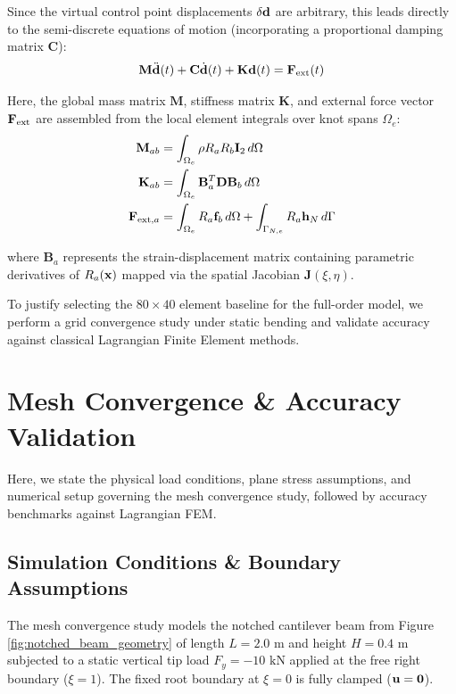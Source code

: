 Since the virtual control point displacements $\delta \mathbf{d}$ are arbitrary, this leads directly to the semi-discrete equations of motion (incorporating a proportional damping matrix $\mathbf{C}$):
\begin{equation}
    \mathbf{M}\ddot{\mathbf{d}}(t) + \mathbf{C}\dot{\mathbf{d}}(t) + \mathbf{K}\mathbf{d}(t) = \mathbf{F}_{\text{ext}}(t)
\end{equation}

Here, the global mass matrix $\mathbf{M}$, stiffness matrix $\mathbf{K}$, and external force vector $\mathbf{F}_{\text{ext}}$ are assembled from the local element integrals over knot spans $\Omega_e$:
\begin{align}
    \mathbf{M}_{ab}   & = \int_{\Omega_e} \rho R_a R_b \mathbf{I}_2 \, d\Omega                                      \\
    \mathbf{K}_{ab}   & = \int_{\Omega_e} \mathbf{B}_a^T \mathbf{D} \mathbf{B}_b \, d\Omega                         \\
    \mathbf{F}_{\text{ext}, a} & = \int_{\Omega_e} R_a \mathbf{f}_b \, d\Omega + \int_{\Gamma_{N,e}} R_a \mathbf{h}_N \, d\Gamma
\end{align}

where $\mathbf{B}_a$ represents the strain-displacement matrix containing parametric derivatives of $R_a(\mathbf{x})$ mapped via the spatial Jacobian $\mathbf{J}(\xi, \eta)$.

To justify selecting the $80 \times 40$ element baseline for the full-order model, we perform a grid convergence study under static bending and validate accuracy against classical Lagrangian Finite Element methods.

\section{Mesh Convergence \& Accuracy Validation}

Here, we state the physical load conditions, plane stress assumptions, and numerical setup governing the mesh convergence study, followed by accuracy benchmarks against Lagrangian FEM.

\subsection{Simulation Conditions \& Boundary Assumptions}
The mesh convergence study models the notched cantilever beam from Figure \ref{fig:notched_beam_geometry} of length $L = 2.0\text{ m}$ and height $H = 0.4\text{ m}$ subjected to a static vertical tip load $F_y = -10\text{ kN}$ applied at the free right boundary ($\xi = 1$). The fixed root boundary at $\xi = 0$ is fully clamped ($\mathbf{u} = \mathbf{0}$).

